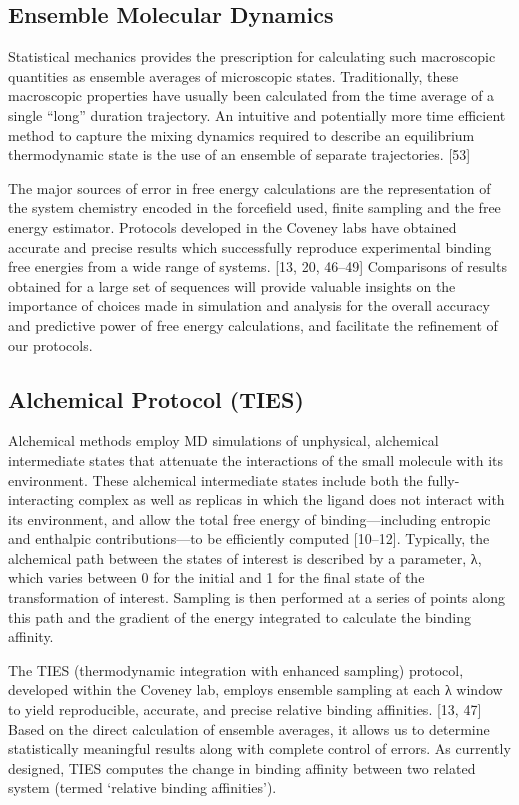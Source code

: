 \documentclass[conference]{IEEEtran}
\begin{document}
\subsection{Ensemble Molecular Dynamics}\label{sec:emd}

Statistical mechanics provides the prescription for calculating such macroscopic quantities as ensemble averages of microscopic states. Traditionally, these macroscopic properties have usually been calculated from the time average of a single “long” duration trajectory. An intuitive and potentially more time efficient method to capture the mixing dynamics required to describe an equilibrium thermodynamic state is the use of an ensemble of separate trajectories. [53]

The major sources of error in free energy calculations are the representation of the system chemistry encoded in the forcefield used, finite sampling and the free energy estimator. Protocols developed in the Coveney labs have obtained accurate and precise results which successfully reproduce experimental binding free energies from a wide range of systems. [13, 20, 46–49] Comparisons of results obtained for a large set of sequences will provide valuable insights on the importance of choices made in simulation and analysis for the overall accuracy and predictive power of free energy calculations, and facilitate the refinement of our protocols. 


\subsection{Alchemical Protocol (TIES)}\label{sec:ties}

Alchemical methods employ MD simulations of unphysical, alchemical intermediate states that attenuate the interactions of the small molecule with its environment. These alchemical intermediate states include both the fully-interacting complex as well as replicas in which the ligand does not interact with its environment, and allow the total free energy of binding—including entropic and enthalpic contributions—to be efficiently computed [10–12]. Typically, the alchemical path between the states of interest is described by a parameter, λ, which varies between 0 for the initial and 1 for the final state of the transformation of interest. Sampling is then performed at a series of points along this path and the gradient of the energy integrated to calculate the binding affinity.

The TIES (thermodynamic integration with enhanced sampling) protocol, developed within the Coveney lab, employs ensemble sampling at each λ window to yield reproducible, accurate, and precise relative binding affinities. [13, 47] Based on the direct calculation of ensemble averages, it allows us to determine statistically meaningful results along with complete control of errors. As currently designed, TIES computes the change in binding affinity between two related system (termed ‘relative binding affinities’).
\end{document}

